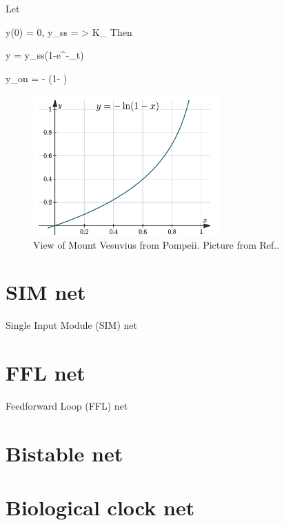 Let 

\beq
y(0) = 0\;,\;\; y_{ss} = \frac{\beta_\rvy}{\alp_{\rvy}}
> K_{\rvy\rvz}
\eeq
Then 

\beq
y = y_{ss}(1-e^{-\alp_\rvy t})
\eeq

\beq
y_{on} = -\;
\ln
\left({1- }
\right)
\eeq

\begin{figure}[h!]
\centering
\includegraphics[width=2.8in]
{autoregulons/-log(1-x).png}
\caption{View of Mount Vesuvius from
  Pompeii.
  Picture from Ref.\cite{alon-book}.}
\label{fig-minus-log-1-minus-x.png}
\end{figure}

\section{SIM net}
Single Input Module (SIM) net

\section{FFL net}

Feedforward Loop (FFL) net

\section{Bistable net}

\section{Biological clock net}